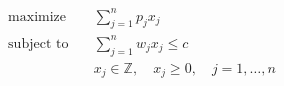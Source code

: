 \begin{align*}
\text{maximize} \quad & \sum_{j=1}^n p_j x_j \\
\text{subject to} \quad & \sum_{j=1}^n w_j x_j \leq c \\
& x_j \in \mathbb{Z}, \quad x_j \geq 0, \quad j = 1, \ldots,n
\end{align*}
